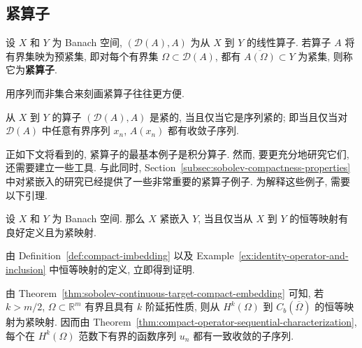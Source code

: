 \subsection{紧算子}\label{sec:compact-operators}\label{sec:integral-operators}

\begin{Definition}
\label{def:compact-operator}
设 $X$ 和 $Y$ 为 Banach 空间, $(\mathcal{D}(A),A)$ 为从 $X$ 到 $Y$ 的线性算子. 若算子 $A$ 将有界集映为预紧集, 即对每个有界集 $\Omega\subset\mathcal{D}(A)$, 都有 $\overline{A(\Omega)}\subset Y$ 为紧集, 则称它为\textbf{紧算子}.
\end{Definition}

用序列而非集合来刻画紧算子往往更方便.

\begin{Theorem}
\label{thm:compact-operator-sequential-characterization}
从 $X$ 到 $Y$ 的算子 $(\mathcal{D}(A),A)$ 是紧的, 当且仅当它是序列紧的; 即当且仅当对 $\mathcal{D}(A)$ 中任意有界序列 $x_n$, $A(x_n)$ 都有收敛子序列.
\end{Theorem}

\begingroup
{}
\renewcommand{\endProof}{\par\nobreak\hfill$\blacksquare$\par\vspace{0.1cm}}
\endgroup

正如下文将看到的, 紧算子的最基本例子是积分算子. 然而, 要更充分地研究它们, 还需要建立一些工具. 与此同时, Section~\ref{subsec:sobolev-compactness-properties} 中对紧嵌入的研究已经提供了一些非常重要的紧算子例子. 为解释这些例子, 需要以下引理.

\begin{Lemma}
\label{lem:compact-embedding-identity-operator}
设 $X$ 和 $Y$ 为 Banach 空间. 那么 $X$ 紧嵌入 $Y$, 当且仅当从 $X$ 到 $Y$ 的恒等映射有良好定义且为紧映射.
\end{Lemma}

由 Definition~\ref{def:compact-imbedding} 以及 Example~\ref{ex:identity-operator-and-inclusion} 中恒等映射的定义, 立即得到证明.

\begin{Example}
\label{ex:sobolev-continuous-target-compact-operator}
由 Theorem~\ref{thm:sobolev-continuous-target-compact-embedding} 可知, 若 $k>m/2$, $\Omega\subset\mathbb{R}^m$ 有界且具有 $k$ 阶延拓性质, 则从 $H^k(\Omega)$ 到 $C_b(\overline\Omega)$ 的恒等映射为紧映射. 因而由 Theorem~\ref{thm:compact-operator-sequential-characterization}, 每个在 $H^k(\Omega)$ 范数下有界的函数序列 $u_n$ 都有一致收敛的子序列.
\end{Example}

